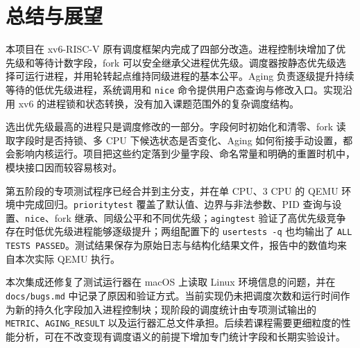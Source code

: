 \chapter{总结与展望}

本项目在 xv6-RISC-V 原有调度框架内完成了四部分改造。进程控制块增加了优先级和等待计数字段，fork 可以安全继承父进程优先级。调度器按静态优先级选择可运行进程，并用轮转起点维持同级进程的基本公平。Aging 负责逐级提升持续等待的低优先级进程，系统调用和 \texttt{nice} 命令提供用户态查询与修改入口。实现沿用 xv6 的进程锁和状态转换，没有加入课题范围外的复杂调度结构。

选出优先级最高的进程只是调度修改的一部分。字段何时初始化和清零、fork 读取字段时是否持锁、多 CPU 下候选状态是否变化、Aging 如何衔接手动设置，都会影响内核运行。项目把这些约定落到少量字段、命名常量和明确的重置时机中，模块接口因而较容易核对。

第五阶段的专项测试程序已经合并到主分支，并在单 CPU、3 CPU 的 QEMU 环境中完成回归。\texttt{prioritytest} 覆盖了默认值、边界与非法参数、PID 查询与设置、\texttt{nice}、fork 继承、同级公平和不同优先级；\texttt{agingtest} 验证了高优先级竞争存在时低优先级进程能够逐级提升；两组配置下的 \texttt{usertests -q} 也均输出了 \texttt{ALL TESTS PASSED}。测试结果保存为原始日志与结构化结果文件，报告中的数值均来自本次实际 QEMU 执行。

本次集成还修复了测试运行器在 macOS 上读取 Linux 环境信息的问题，并在 \texttt{docs/bugs.md} 中记录了原因和验证方式。当前实现仍未把调度次数和运行时间作为新的持久化字段加入进程控制块；现阶段的调度统计由专项测试输出的 \texttt{METRIC}、\texttt{AGING\_RESULT} 以及运行器汇总文件承担。后续若课程需要更细粒度的性能分析，可在不改变现有调度语义的前提下增加专门统计字段和长期实验设计。
